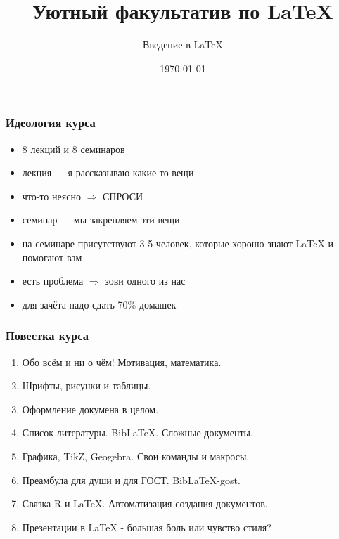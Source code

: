 \documentclass[newPxFont]{beamer}
\title{Уютный факультатив по \LaTeX}
\subtitle{Введение в \LaTeX}
\date{\today}
\begin{document}
\begingroup
{}
\begin{frame}[plain]
\begin{center}
\LARGE{\color{red}{ВНИМАНИЕ!}}
\end{center}
\color{white}{ДАННЫЙ КУРС СОДЕРЖИТ БОЛЬШОЕ КОЛИЧЕСТВО РАЗНООБРАЗНОГО КОДА И ЗАДАНИЙ ДЛЯ САМОСТОЯТЕЛЬНОГО РЕШЕНИЯ.\\ НА ПЕРВЫЙ ВЗГЛЯД ОН МОЖЕТ ПОКАЗАТЬСЯ СЛОЖНЫМ И ТРАВМИРОВАТЬ НЕПОДГОТОВЛЕННУЮ ПСИХИКУ. \\ ТАКЖЕ ОН СОДЕРЖИТ БОЛЬШОЕ КОЛИЧЕСТВО НЕУДАЧНЫХ ШУТОК И НЕУМЕСТНЫХ ОТСЫЛОК. \\ В СВЯЗИ С ЭТИМ КУРС НЕ РЕКОМЕНДУЕТСЯ ПРОСЛУШИВАТЬ \ldots НИКОМУ.}
\end{frame}
\endgroup 

 \maketitle
 
\begin{frame}
\frametitle{Идеология курса}
\begin{itemize}
\item 8 лекций и 8 семинаров 
\item лекция --- я рассказываю какие-то вещи
\item что-то неясно $\Rightarrow$ \alert{СПРОСИ}
\item семинар --- мы закрепляем эти вещи
\item на семинаре присутствуют 3-5 человек, которые хорошо знают \LaTeX{} и помогают вам
\item есть проблема $\Rightarrow$ \alert{зови одного из нас}
\item для зачёта надо сдать 70\% домашек
\end{itemize} 
\end{frame} 


\begin{frame}
\frametitle{Повестка курса}
\begin{enumerate}
\item Обо всём и ни о чём! Мотивация, математика.
\item Шрифты, рисунки и таблицы.
\item Оформление докумена в целом.
\item Список литературы. Bib\LaTeX{}. Сложные документы.
\item Графика, TikZ, Geogebra. Свои команды и макросы.
\item Преамбула для души и для ГОСТ. Bib\LaTeX{-gost}.
\item Связка R и \LaTeX{}. Автоматизация создания документов.
\item Презентации в \LaTeX{} - большая боль или чувство стиля?
\end{enumerate}
\end{frame} 
\end{document}
